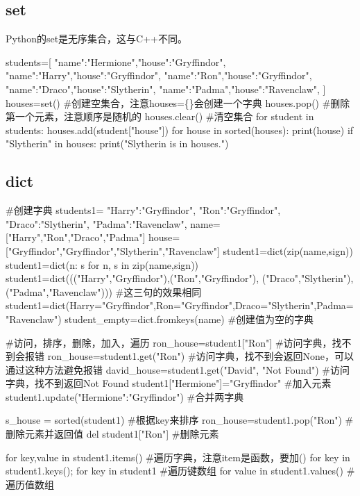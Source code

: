   \subsection{set}
    Python的set是无序集合，这与C++不同。
    \begin{codeblock}[language=python, caption={basic operation of set}]
      students=[
        {"name":"Hermione","house":"Gryffindor"},
        {"name":"Harry","house":"Gryffindor"},
        {"name":"Ron","house":"Gryffindor"},
        {"name":"Draco","house":"Slytherin"},
        {"name":"Padma","house":"Ravenclaw"},
      ]
      houses=set() #创建空集合，注意houses=\{\}会创建一个字典
      houses.pop() #删除第一个元素，注意顺序是随机的
      houses.clear() #清空集合
      for student in students:
        houses.add(student["house"])
      for house in sorted(houses):
        print(house)
      if "Slytherin" in houses:
        print("Slytherin is in houses.")
    \end{codeblock}

  \subsection{dict}
    \begin{codeblock}[language=python, caption={basic operation of dictionary}]
      #创建字典
      students1={
        "Harry":"Gryffindor",
        "Ron":"Gryffindor",
        "Draco":"Slytherin",
        "Padma":"Ravenclaw",
      }
      name=["Harry","Ron","Draco","Padma"]
      house=["Gryffindor","Gryffindor","Slytherin","Ravenclaw"]
      student1=dict(zip(name,sign)) 
      student1=dict(n: s for n, s in zip(name,sign))
      student1=dict((("Harry","Gryffindor"),("Ron","Gryffindor"),
          ("Draco","Slytherin"),("Padma","Ravenclaw"))) #这三句的效果相同
      student1=dict(Harry="Gryffindor",Ron="Gryffindor",Draco="Slytherin",Padma="Ravenclaw")
      student_empty=dict.fromkeys(name) #创建值为空的字典

      #访问，排序，删除，加入，遍历
      ron_house=student1["Ron"] #访问字典，找不到会报错
      ron_house=student1.get("Ron") #访问字典，找不到会返回None，可以通过这种方法避免报错
      david_house=student1.get("David", "Not Found") #访问字典，找不到返回Not Found
      student1["Hermione"]="Gryffindor" #加入元素
      student1.update({"Hermione":"Gryffindor"}) #合并两字典

      s_house = sorted(student1) #根据key来排序
      ron_house=student1.pop("Ron") #删除元素并返回值
      del student1["Ron"] #删除元素

      for key,value in student1.items() #遍历字典，注意item是函数，要加()
      for key in student1.keys(); for key in student1 #遍历键数组
      for value in student1.values() #遍历值数组
    \end{codeblock}

